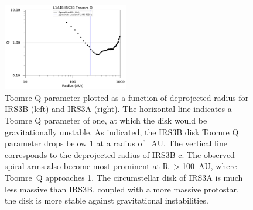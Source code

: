 \begin{figure}[H]
\begin{center}
\includegraphics[width=0.49\textwidth]{img/L1448N-toomre-Q-linear-xsec-c17o_cont.pdf}
\end{center}   
\caption{Toomre Q parameter plotted as a function of deprojected radius for IRS3B (left) and IRS3A (right). The horizontal line indicates a Toomre Q parameter of one, at which the disk would be gravitationally unstable. As indicated, the IRS3B disk Toomre Q parameter drops below 1 at a radius of ~AU. The vertical line corresponds to the deprojected radius of IRS3B-c. The observed spiral arms also become most prominent at R $>$100~AU, where Toomre~Q approaches 1. The circumstellar disk of IRS3A is much less massive than IRS3B, coupled with a more massive protostar, the disk is more stable against gravitational instabilities.}\label{fig:irs3btoomreq}
\end{figure}

